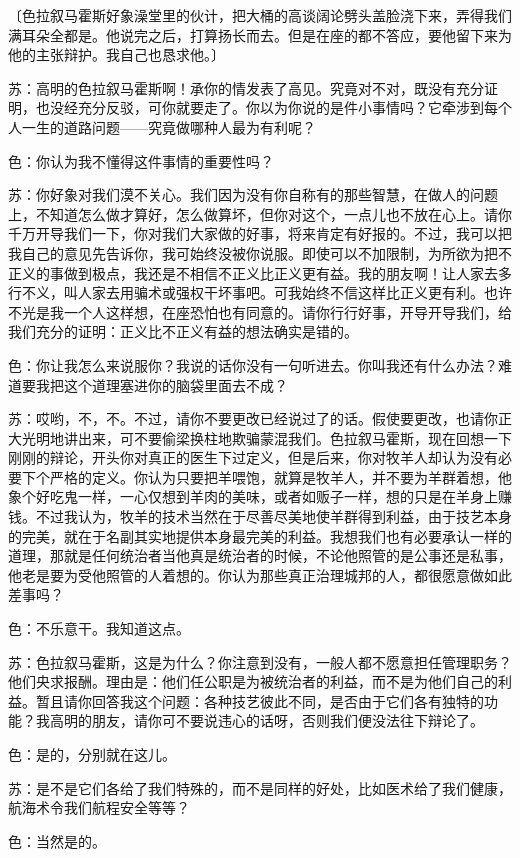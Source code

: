 \documentclass[11pt,oneside]{book}
\begin{document}
\begin{common-format}
〔色拉叙马霍斯好象澡堂里的伙计，把大桶的高谈阔论劈头盖脸浇下来，弄得我们满耳朵全都是。他说完之后，打算扬长而去。但是在座的都不答应，要他留下来为他的主张辩护。我自己也恳求他。〕

苏：高明的色拉叙马霍斯啊！承你的情发表了高见。究竟对不对，既没有充分证明，也没经充分反驳，可你就要走了。你以为你说的是件小事情吗？它牵涉到每个人一生的道路问题——究竟做哪种人最为有利呢？

色：你认为我不懂得这件事情的重要性吗？

苏：你好象对我们漠不关心。我们因为没有你自称有的那些智慧，在做人的问题上，不知道怎么做才算好，怎么做算坏，但你对这个，一点儿也不放在心上。请你千万开导我们一下，你对我们大家做的好事，将来肯定有好报的。不过，我可以把我自己的意见先告诉你，我可始终没被你说服。即使可以不加限制，为所欲为把不正义的事做到极点，我还是不相信不正义比正义更有益。我的朋友啊！让人家去多行不义，叫人家去用骗术或强权干坏事吧。可我始终不信这样比正义更有利。也许不光是我一个人这样想，在座恐怕也有同意的。请你行行好事，开导开导我们，给我们充分的证明：正义比不正义有益的想法确实是错的。

色：你让我怎么来说服你？我说的话你没有一句听进去。你叫我还有什么办法？难道要我把这个道理塞进你的脑袋里面去不成？

苏：哎哟，不，不。不过，请你不要更改已经说过了的话。假使要更改，也请你正大光明地讲出来，可不要偷梁换柱地欺骗蒙混我们。色拉叙马霍斯，现在回想一下刚刚的辩论，开头你对真正的医生下过定义，但是后来，你对牧羊人却认为没有必要下个严格的定义。你认为只要把羊喂饱，就算是牧羊人，并不要为羊群着想，他象个好吃鬼一样，一心仅想到羊肉的美味，或者如贩子一样，想的只是在羊身上赚钱。不过我认为，牧羊的技术当然在于尽善尽美地使羊群得到利益，由于技艺本身的完美，就在于名副其实地提供本身最完美的利益。我想我们也有必要承认一样的道理，那就是任何统治者当他真是统治者的时候，不论他照管的是公事还是私事，他老是要为受他照管的人着想的。你认为那些真正治理城邦的人，都很愿意做如此差事吗？

色：不乐意干。我知道这点。

苏：色拉叙马霍斯，这是为什么？你注意到没有，一般人都不愿意担任管理职务？他们央求报酬。理由是：他们任公职是为被统治者的利益，而不是为他们自己的利益。暂且请你回答我这个问题：各种技艺彼此不同，是否由于它们各有独特的功能？我高明的朋友，请你可不要说违心的话呀，否则我们便没法往下辩论了。

色：是的，分别就在这儿。

苏：是不是它们各给了我们特殊的，而不是同样的好处，比如医术给了我们健康，航海术令我们航程安全等等？

色：当然是的。


\end{common-format}
\end{document}
